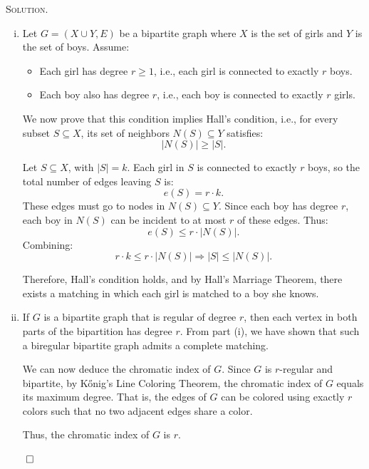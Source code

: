 \documentclass[12pt, a4paper, oneside]{ctexart}
\newenvironment{solution}{%
	\par\noindent\textsc{Solution. }\ignorespaces
}{%
	\hfill$\qed$\par
}
\begin{document}
	\begin{solution}
		
		\begin{enumerate}[(i)]
			\item 
			Let \( G = (X \cup Y, E) \) be a bipartite graph where \( X \) is the set of girls and \( Y \) is the set of boys. Assume:
			\begin{itemize}
				\item Each girl has degree \( r \geq 1 \), i.e., each girl is connected to exactly \( r \) boys.
				\item Each boy also has degree \( r \), i.e., each boy is connected to exactly \( r \) girls.
			\end{itemize}
			
			We now prove that this condition implies Hall's condition, i.e., for every subset \( S \subseteq X \), its set of neighbors \( N(S) \subseteq Y \) satisfies:
			\[
			|N(S)| \geq |S|.
			\]
			
			Let \( S \subseteq X \), with \( |S| = k \). Each girl in \( S \) is connected to exactly \( r \) boys, so the total number of edges leaving \( S \) is:
			\[
			e(S) = r \cdot k.
			\]
			These edges must go to nodes in \( N(S) \subseteq Y \). Since each boy has degree \( r \), each boy in \( N(S) \) can be incident to at most \( r \) of these edges. Thus:
			\[
			e(S) \leq r \cdot |N(S)|.
			\]
			Combining:
			\[
			r \cdot k \leq r \cdot |N(S)| \Rightarrow |S| \leq |N(S)|.
			\]
			
			Therefore, Hall's condition holds, and by Hall's Marriage Theorem, there exists a matching in which each girl is matched to a boy she knows.
			
			\item 			

			If \( G \) is a bipartite graph that is regular of degree \( r \), then each vertex in both parts of the bipartition has degree \( r \). From part (i), we have shown that such a biregular bipartite graph admits a complete matching.
			
			We can now deduce the chromatic index of \( G \).
		    Since \( G \) is \( r \)-regular and bipartite, by K\H{o}nig's Line Coloring Theorem, the chromatic index of \( G \) equals its maximum degree.
		    That is, the edges of \( G \) can be colored using exactly \( r \) colors such that no two adjacent edges share a color.

			Thus, the chromatic index of \( G \) is \( r \).
			
		\end{enumerate}
	
		
	\end{solution}
	
\end{document}
